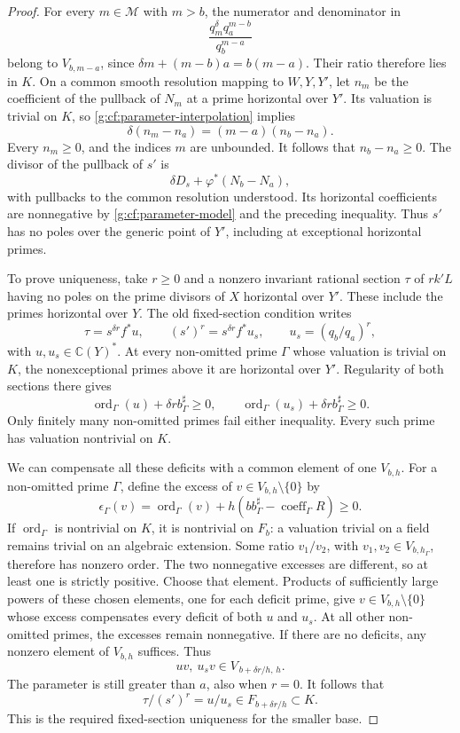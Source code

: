 \begin{proof}
For every \(m\in\mathcal M\) with \(m>b\), the numerator and
denominator in
\begin{equation}\label{g:cf:parameter-interpolation}
 \frac{q_m^{\delta}q_a^{m-b}}{q_b^{m-a}}
\end{equation}
belong to \(V_{b,m-a}\), since
\(\delta m+(m-b)a=b(m-a)\).  Their ratio therefore lies in
\(K\).  On a common smooth resolution mapping to \(W,Y,Y'\),
let \(n_m\) be the coefficient of the pullback of \(N_m\) at a
prime horizontal over \(Y'\).  Its valuation is trivial on
\(K\), so \eqref{g:cf:parameter-interpolation} implies
\[
 \delta(n_m-n_a)=(m-a)(n_b-n_a).
\]
Every \(n_m\geq0\), and the indices \(m\) are unbounded.
It follows that \(n_b-n_a\geq0\).  The divisor of the pullback
of \(s'\) is
\[
 \delta D_s+\varphi^*(N_b-N_a),
\]
with pullbacks to the common resolution understood.  Its
horizontal coefficients are nonnegative by
\eqref{g:cf:parameter-model} and the preceding inequality.
Thus \(s'\) has no poles over the generic point of \(Y'\),
including at exceptional horizontal primes.

To prove uniqueness, take \(r\geq0\) and a nonzero invariant
rational section \(\tau\) of \(rk'L\) having no poles on the
prime divisors of \(X\) horizontal over \(Y'\).  These include
the primes horizontal over \(Y\).  The old fixed-section
condition writes
\[
 \tau=s^{\delta r}f^*u,\qquad
 (s')^r=s^{\delta r}f^*u_s,
 \qquad u_s=(q_b/q_a)^r,
\]
with \(u,u_s\in\mathbb C(Y)^*\).  At every non-omitted prime
\(\Gamma\) whose valuation is trivial on \(K\), the
nonexceptional primes above it are horizontal over \(Y'\).
Regularity of both sections there gives
\begin{equation}\label{g:cf:parameter-horizontal-tests}
 \operatorname{ord}_\Gamma(u)+\delta r b^\sharp_\Gamma\geq0,
 \qquad
 \operatorname{ord}_\Gamma(u_s)+\delta r b^\sharp_\Gamma\geq0.
\end{equation}
Only finitely many non-omitted primes fail either inequality.
Every such prime has valuation nontrivial on \(K\).

We can compensate all these deficits with a common element of
one \(V_{b,h}\).  For a non-omitted prime \(\Gamma\), define
the excess of \(v\in V_{b,h}\setminus\{0\}\) by
\[
 \epsilon_\Gamma(v)=
 \operatorname{ord}_\Gamma(v)
   +h(bb^\sharp_\Gamma-\operatorname{coeff}_\Gamma R)
 \geq0.
\]
If \(\operatorname{ord}_\Gamma\) is nontrivial on \(K\), it is
nontrivial on \(F_b\): a valuation trivial on a field remains
trivial on an algebraic extension.  Some ratio \(v_1/v_2\), with
\(v_1,v_2\in V_{b,h_\Gamma}\), therefore has nonzero order.
The two nonnegative excesses are different, so at least one is
strictly positive.  Choose that element.  Products of sufficiently
large powers of these chosen elements, one for each deficit
prime, give \(v\in V_{b,h}\setminus\{0\}\) whose excess
compensates every deficit of both \(u\) and \(u_s\).
At all other non-omitted primes, the excesses remain nonnegative.
If there are no deficits, any nonzero element of \(V_{b,h}\)
suffices.  Thus
\[
 uv,\ u_s v\in V_{\,b+\delta r/h,\,h}.
\]
The parameter is still greater than \(a\), also when \(r=0\).
It follows that
\[
 \tau/(s')^r=u/u_s\in F_{b+\delta r/h}\subset K.
\]
This is the required fixed-section uniqueness for the smaller
base.


\end{proof}
